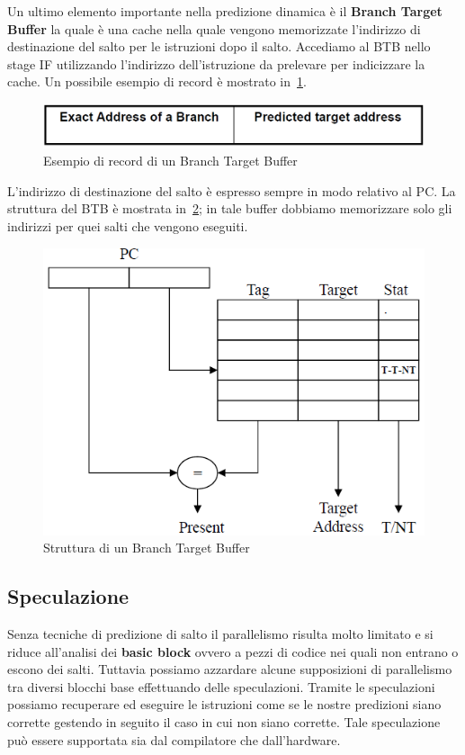 Un ultimo elemento importante nella predizione dinamica è il \textbf{Branch Target Buffer} la quale è una cache nella quale vengono memorizzate l'indirizzo di destinazione del salto per le istruzioni dopo il salto. Accediamo al BTB nello stage IF utilizzando l'indirizzo dell'istruzione da prelevare per indicizzare la cache. Un possibile esempio di record è mostrato in \figurename\,\ref{fig:btbrecord}.
\begin{figure}[htb]
\centering
\includegraphics[scale=0.5]{img/btbrecord.png}
\caption{Esempio di record di un Branch Target Buffer}\label{fig:btbrecord}
\end{figure}
L'indirizzo di destinazione  del salto è espresso sempre in modo relativo al PC.
La struttura del BTB è mostrata in \figurename\,\ref{fig:btbstrut}; in tale buffer dobbiamo memorizzare solo gli indirizzi per quei salti che vengono eseguiti.
\begin{figure}[htb]
\centering
\includegraphics[scale=0.5]{img/btbstrut.png}
\caption{Struttura di un Branch Target Buffer}\label{fig:btbstrut}
\end{figure}
\subsection{Speculazione}
Senza tecniche di predizione di salto il parallelismo risulta molto limitato e si riduce all'analisi dei \textbf{basic block} ovvero a pezzi di codice nei quali non entrano o escono dei salti. Tuttavia possiamo azzardare alcune supposizioni di parallelismo tra diversi blocchi base effettuando delle speculazioni. Tramite le speculazioni possiamo recuperare ed eseguire le istruzioni come se le nostre predizioni siano corrette gestendo in seguito il caso in cui non siano corrette. Tale speculazione può essere supportata sia dal compilatore che dall'hardware.